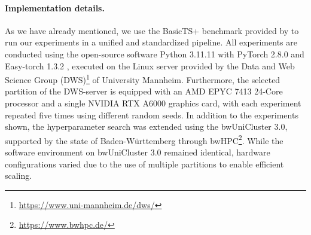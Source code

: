 \documentclass[a4paper,oneside,bibliography=totoc]{scrbook}
\begin{document}
\paragraph{Implementation details.}
As we have already mentioned, we use the BasicTS+ %
benchmark provided by \citet{shao_exploring_2025} to run our experiments in a unified and standardized pipeline.
All experiments are conducted using the open-source software Python 3.11.11 \cite{van_rossum_python_1995} with PyTorch 2.8.0 %
\cite{paszke_pytorch_2019} and Easy-torch 1.3.2 \cite{wang_easytorch_2020}, executed on the Linux server provided by the Data and Web Science Group (DWS)\footnote{\href{https://www.uni-mannheim.de/dws/}{\url{https://www.uni-mannheim.de/dws/}}} of University Mannheim.
Furthermore, the selected partition of the DWS-server is equipped with an AMD EPYC 7413 24-Core processor and a single NVIDIA RTX A6000 graphics card, with each experiment repeated five times using different random seeds.
In addition to the experiments shown, the hyperparameter search was extended using the bwUniCluster 3.0, supported by the state of Baden-Württemberg through bwHPC\footnote{\href{https://www.bwhpc.de/}{\url{https://www.bwhpc.de/}}}. 
While the software environment on bwUniCluster 3.0 remained identical, hardware configurations varied due to the use of multiple partitions to enable efficient scaling.

\end{document}
